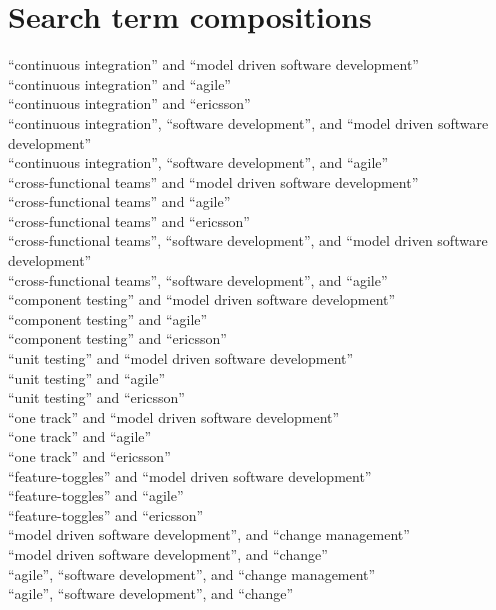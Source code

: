 \documentclass[final_report_innit.tex]{subfiles}
\begin{document}
\section{Search term compositions}\label{appendixSearchTerms}


\noindent
``continuous integration'' and ``model driven software development'' \\
``continuous integration'' and ``agile'' \\
``continuous integration'' and ``ericsson'' \\
``continuous integration'', ``software development'', and ``model driven software development'' \\
``continuous integration'', ``software development'', and ``agile'' \\
``cross-functional teams'' and ``model driven software development'' \\
``cross-functional teams'' and ``agile'' \\
``cross-functional teams'' and ``ericsson'' \\
``cross-functional teams'', ``software development'', and ``model driven software development'' \\
``cross-functional teams'', ``software development'', and ``agile'' \\
``component testing'' and ``model driven software development'' \\
``component testing'' and ``agile'' \\
``component testing'' and ``ericsson'' \\
``unit testing'' and ``model driven software development'' \\
``unit testing'' and ``agile'' \\
``unit testing'' and ``ericsson'' \\
``one track'' and ``model driven software development'' \\
``one track'' and ``agile'' \\
``one track'' and ``ericsson'' \\
``feature-toggles'' and ``model driven software development'' \\
``feature-toggles'' and ``agile'' \\
``feature-toggles'' and ``ericsson'' \\
``model driven software development'', and ``change management'' \\
``model driven software development'', and ``change'' \\
``agile'', ``software development'', and ``change management'' \\
``agile'', ``software development'', and ``change'' \\



\clearpage
\end{document}
